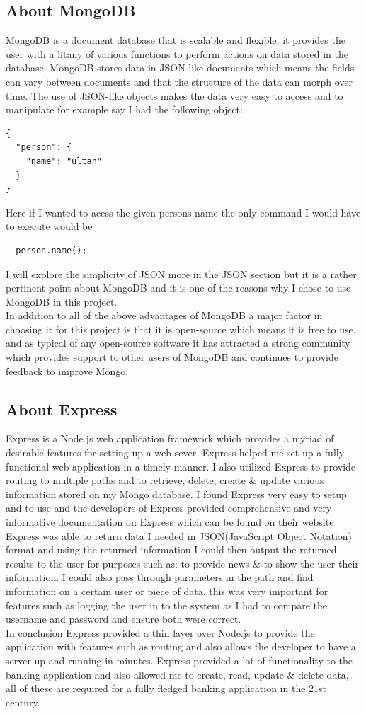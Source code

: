 \subsection{About MongoDB}
MongoDB is a document database that is scalable and flexible, it provides the user with a litany of various functions to perform actions on data stored in the database.  MongoDB stores data in JSON-like documents which means the fields can vary between documents and that the structure of the data can morph over time.  The use of JSON-like objects makes the data very easy to access and to manipulate for example say I had the following object:
\begin{verbatim}
{
  "person": {
    "name": "ultan"
  }
}
\end{verbatim}
Here if I wanted to acess the given persons name the only command I would have to execute would be \begin{verbatim}
  person.name();
\end{verbatim}
I will explore the simplicity of JSON more in the JSON section but it is a rather pertinent point about MongoDB and it is one of the reasons why I chose to use MongoDB in this project.
\\
 In addition to all of the above advantages of MongoDB a major factor in choosing it for this project is that it is open-source which means it is free to use, and as typical of any open-source software it has attracted a strong community which provides support to other users of MongoDB and continues to provide feedback to improve Mongo.
\subsection{About Express}
Express is a Node.js web application framework which provides a myriad of desirable features for setting up a web sever.  Express helped me set-up a fully functional web application in a timely manner.  I also utilized Express to provide routing to multiple paths and to retrieve, delete, create \& update various information stored on my Mongo database.  I found Express very easy to setup and to use and the developers of Express provided comprehensive and very informative documentation on Express which can be found on their website\cite{ExpressDocs}
\\
 Express was able to return data I needed in JSON(JavaScript Object Notation) format and using the returned information I could then output the returned results to the user for purposes such as: to provide news \& to show the user their information.  I could also pass through parameters in the path and find information on a certain user or piece of data, this was very important for features such as logging the user in to the system as I had to compare the username and password and ensure both were correct.
 \\
 In conclusion Express provided a thin layer over Node.js to provide the application with features such as routing and also allows the developer to have a server up and running in minutes.  Express provided a lot of functionality to the banking application and also allowed me to create, read, update \& delete data, all of these are required for a fully fledged banking application in the 21st century.
